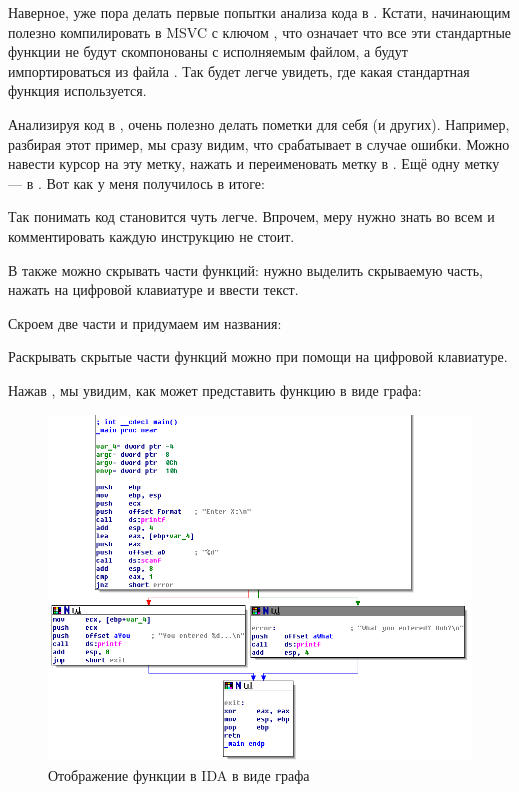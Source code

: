 
Наверное, уже пора делать первые попытки анализа кода в \IDA.
Кстати, начинающим полезно компилировать в MSVC с ключом , что означает что все эти стандартные
функции не будут скомпонованы с исполняемым файлом, а будут импортироваться из файла .
Так будет легче увидеть, где какая стандартная функция используется.

Анализируя код в \IDA, очень полезно делать пометки для себя (и других).
Например, разбирая этот пример, мы сразу видим, что  срабатывает в случае ошибки.
Можно навести курсор на эту метку, нажать  и переименовать метку в .
Ещё одну метку --- в .
Вот как у меня получилось в итоге:



Так понимать код становится чуть легче.
Впрочем, меру нужно знать во всем и комментировать каждую инструкцию не стоит.

В \IDA также можно скрывать части функций: нужно выделить скрываемую часть, нажать \q{--} на цифровой клавиатуре и ввести текст.

Скроем две части и придумаем им названия:



Раскрывать скрытые части функций можно при помощи \q{+} на цифровой клавиатуре.

\clearpage
Нажав , мы увидим, как \IDA может представить функцию в виде графа:

\begin{figure}[H]
\centering
\includegraphics[scale=\FigScale]{patterns/04_scanf/3_checking_retval/IDA.png}
\caption{Отображение функции в IDA в виде графа}
\label{fig:ex3_IDA_1}
\end{figure}

